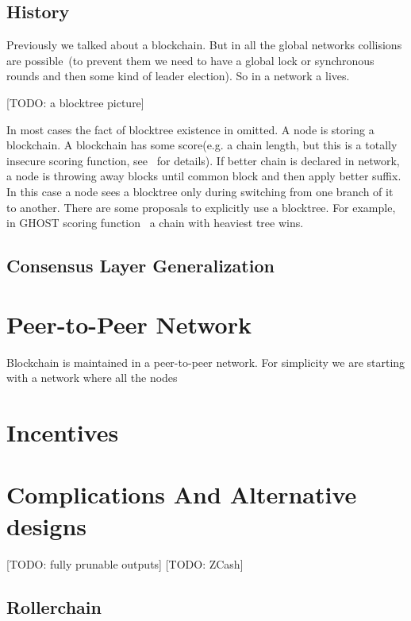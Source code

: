\documentclass[]{report}   %
\begin{document}
\subsection{History}

Previously we talked about a blockchain. But in all the global networks collisions are possible~(to prevent them we need to have a global lock or synchronous rounds and then some kind of leader election). So in a network a  lives.

[TODO: a blocktree picture]

In most cases the fact of blocktree existence in omitted. A node is storing a blockchain. A blockchain has some score(e.g. a chain length, but this is a totally insecure scoring function, see~\cite{stackexchange} for details). If better chain is declared in network, a node is throwing away blocks until common block and then apply better suffix. In this case a node sees a blocktree only during switching from one branch of it to another. There are some proposals to explicitly use a blocktree. For example, in GHOST scoring function~\cite{sompolinsky2015secure} a chain with heaviest tree wins. 


\subsection{Consensus Layer Generalization}

\section{Peer-to-Peer Network}	

Blockchain is maintained in a peer-to-peer network. For simplicity we are starting with a network where all the nodes 

\section{Incentives}



\section{Complications And Alternative designs}

[TODO: fully prunable outputs]
[TODO: ZCash]

\subsection{Rollerchain}
\end{document}
